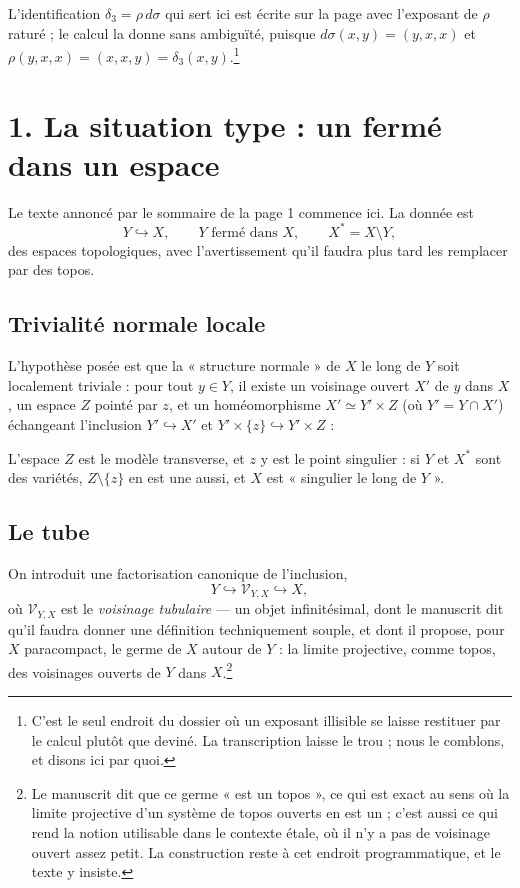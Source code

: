 \documentclass[11pt,a4paper]{article}
\begin{document}
L'identification $\delta_{3} = \rho\,d\sigma$ qui sert ici est écrite sur la
page avec l'exposant de $\rho$ raturé ; le calcul la donne sans ambiguïté,
puisque $d\sigma(x,y) = (y,x,x)$ et $\rho(y,x,x) = (x,x,y) =
\delta_{3}(x,y)$.\footnote{C'est le seul endroit du dossier où un exposant
illisible se laisse restituer par le calcul plutôt que deviné. La transcription
laisse le trou ; nous le comblons, et disons ici par quoi.}

\section*{1. La situation type : un fermé dans un espace}

Le texte annoncé par le sommaire de la page 1 commence ici. La donnée est
\[
  Y \hookrightarrow X, \qquad Y \text{ fermé dans } X,
  \qquad X^{*} = X \setminus Y,
\]
des espaces topologiques, avec l'avertissement qu'il faudra plus tard les
remplacer par des topos.

\subsection*{Trivialité normale locale}

L'hypothèse posée est que la « structure normale » de $X$ le long de $Y$ soit
localement triviale : pour tout $y \in Y$, il existe un voisinage ouvert $X'$ de
$y$ dans $X$, un espace $Z$ pointé par $z$, et un homéomorphisme
$X' \simeq Y' \times Z$ (où $Y' = Y \cap X'$) échangeant l'inclusion
$Y' \hookrightarrow X'$ et $Y' \times \{z\} \hookrightarrow Y' \times Z$ :


L'espace $Z$ est le modèle transverse, et $z$ y est le point singulier : si $Y$
et $X^{*}$ sont des variétés, $Z \setminus \{z\}$ en est une aussi, et $X$ est
« singulier le long de $Y$ ».

\subsection*{Le tube}

On introduit une factorisation canonique de l'inclusion,
\[
  Y \hookrightarrow \mathcal{V}_{Y,X} \hookrightarrow X,
\]
où $\mathcal{V}_{Y,X}$ est le \emph{voisinage tubulaire} — un objet
infinitésimal, dont le manuscrit dit qu'il faudra donner une définition
techniquement souple, et dont il propose, pour $X$ paracompact, le germe de $X$
autour de $Y$ : la limite projective, comme topos, des voisinages ouverts de $Y$
dans $X$.\footnote{Le manuscrit dit que ce germe « est un topos », ce qui est
exact au sens où la limite projective d'un système de topos ouverts en est un ;
c'est aussi ce qui rend la notion utilisable dans le contexte étale, où il n'y a
pas de voisinage ouvert assez petit. La construction reste à cet endroit
programmatique, et le texte y insiste.}
\end{document}
